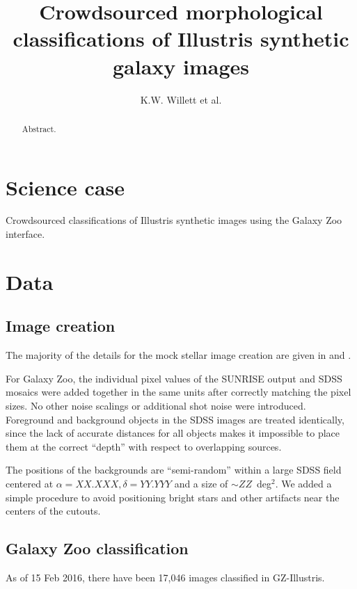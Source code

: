 \documentclass[iop,apj,tighten]{emulateapj}
\begin{document}
\title{Crowdsourced morphological classifications of Illustris synthetic galaxy images}
\author{K.W. Willett et al.}

\begin{abstract}
Abstract.
\end{abstract}

\maketitle

\section{Science case}

Crowdsourced classifications of Illustris synthetic images \citep{sny15,tor15} using the Galaxy Zoo \citep{lin08,wil13} interface. 

\section{Data}

\subsection{Image creation}\label{ssec:image_creation}

The majority of the details for the mock stellar image creation are given in \citet{tor15} and \citet{sny15}. 

For Galaxy Zoo, the individual pixel values of the \textsc{SUNRISE} \citep{jon06a,jon10} output and SDSS mosaics were added together in the same units after correctly matching the pixel sizes.  No other noise scalings or additional shot noise were introduced. Foreground and background objects in the SDSS images are treated identically, since the lack of accurate distances for all objects makes it impossible to place them at the correct ``depth'' with respect to overlapping sources. 

The positions of the backgrounds are ``semi-random'' within a large SDSS field centered at $\alpha=XX.XXX,\delta=YY.YYY$ and a size of $\sim ZZ$~deg$^2$. We added a simple procedure to avoid positioning bright stars and other artifacts near the centers of the cutouts. 

\subsection{Galaxy Zoo classification}
As of 15 Feb 2016, there have been 17,046 images classified in GZ-Illustris. 
\end{document}
